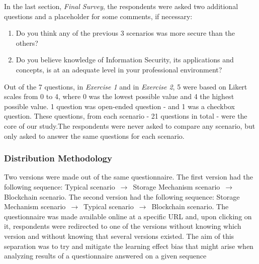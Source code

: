 In the last section, \textit{Final Survey}, the respondents were asked two additional questions and a placeholder for some comments, if necessary:

\begin{enumerate}
	\item Do you think any of the previous 3 scenarios was more secure than the others?
	\item Do you believe knowledge of Information Security, its applications and concepts, is at an adequate level in your professional environment?
\end{enumerate}

Out of the 7 questions, in \textit{Exercise 1} and in \textit{Exercise 2}, 5 were based on Likert scales from 0 to 4, where 0 was the lowest possible value and 4 the highest possible value. 1 question was open-ended question - and 1 was a checkbox question. These questions, from each scenario - 21 questions in total - were the core of our study.The respondents were never asked to compare any scenario, but only asked to answer the same questions for each scenario.

\subsubsection{Distribution Methodology}

Two versions were made out of the same questionnaire. The first version had the following sequence: Typical scenario $\,\to\,$ Storage Mechanism scenario $\,\to\,$ Blockchain scenario. The second version had the following sequence: Storage Mechanism scenario $\,\to\,$ Typical scenario $\,\to\,$ Blockchain scenario. The questionnaire was made available online at a specific URL and, upon clicking on it, respondents were redirected to one of the versions without knowing which version and without knowing that several versions existed. The aim of this separation was to try and mitigate the learning effect bias that might arise when analyzing results of a questionnaire answered on a given sequence

